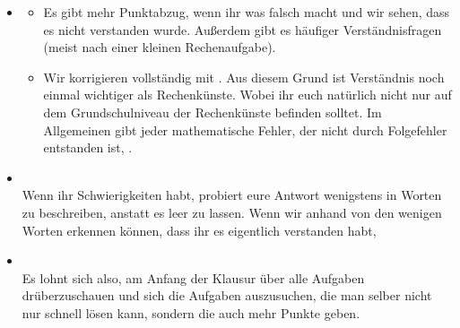 \documentclass{scrartcl}
\begin{document}
\begin{itemize}
\begin{itemize}
			\item Es werden  1-2 Aufgaben drankommen, die in der Kategorie der grafischen Aufgaben eingeordnet werden kann. Also Informationen aus einer Grafik auslesen, selber etwas in eine Grafik einzeichnen, anhand einer argumentieren oder oder oder \dots
			
			\item Die letzte Aufgabe der Klausur ist . Hierbei gilt, dass man in Java oder Java-ähnlichem Pseudocode geschrieben werden muss. Solange ihr nicht von irgendwelchen Packages ausgeht, die euch alle Funktionalitäten abnehmen und euer Code verständlich ist, alles super! \\
			Noch etwas dazu: Die Programmieraufgabe sieht meist doof aus, ist aber billig und gibt für den Zeitaufwand überdurschnittlich viele Punkte. Es lohnt sich also, diese zu bearbeiten.
		
			\item Es gibt immer 2-3 Teilaufgaben, die sehr schwierig sind bzw.  behandelt worden sind. Macht euch darüber keine Sorge, ohne diese kann man immer noch eine 1,3 schreiben.
		\end{itemize}
		
		\item {}
		\begin{itemize}
			\item Es gibt mehr Punktabzug, wenn ihr was falsch macht und wir sehen, dass es nicht verstanden wurde. Außerdem gibt es häufiger Verständnisfragen (meist nach einer kleinen Rechenaufgabe).
			\item Wir korrigieren vollständig mit . Aus diesem Grund ist Verständnis noch einmal wichtiger als Rechenkünste. Wobei ihr euch natürlich nicht nur auf dem Grundschulniveau der Rechenkünste befinden solltet. Im Allgemeinen gibt jeder mathematische Fehler, der nicht durch Folgefehler entstanden ist, .
		\end{itemize}
		
		\item {}\\
		Wenn ihr Schwierigkeiten habt, probiert eure Antwort wenigstens in Worten zu beschreiben, anstatt es leer zu lassen. Wenn wir anhand von den wenigen Worten erkennen können, dass ihr es eigentlich verstanden habt, 
		
		\item {}\\
		 Es lohnt sich also, am Anfang der Klausur über alle Aufgaben drüberzuschauen und sich die Aufgaben auszusuchen, die man selber nicht nur schnell lösen kann, sondern die auch mehr Punkte geben.
		

\end{itemize}
\end{document}
